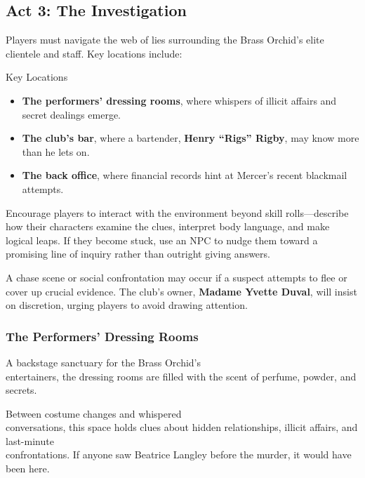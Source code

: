 \subsection{Act 3: The Investigation} 

Players must navigate the web of lies surrounding the Brass Orchid’s elite clientele and staff. Key locations include:
\begin{Example}{Key Locations}
	\begin{itemize}\raggedright
		\item \textbf{The performers’ dressing rooms}, where whispers of illicit affairs and secret dealings emerge.
		\item \textbf{The club’s bar}, where a bartender, \textbf{Henry ``Rigs'' Rigby}, may know more than he lets on.
		\item \textbf{The back office}, where financial records hint at Mercer’s recent blackmail attempts.
	\end{itemize}
\end{Example}

\begin{GmTips}
	Encourage players to interact with the environment beyond skill rolls—describe how their characters examine the clues, interpret body language, and make logical leaps. If they become stuck, use an NPC to nudge them toward a promising line of inquiry rather than outright giving answers.
\end{GmTips}

\noindent
A chase scene or social confrontation may occur if a suspect attempts to flee or cover up crucial evidence. The club’s owner, \textbf{Madame Yvette Duval}, will insist on discretion, urging players to avoid drawing attention.


\subsubsection{The Performers’ Dressing Rooms}

A backstage sanctuary for the Brass Orchid’s\\ entertainers, the dressing rooms are filled with the scent of perfume, powder, and secrets.

Between costume changes and whispered\\ conversations, this space holds clues about hidden relationships, illicit affairs, and last-minute\\ confrontations. If anyone saw Beatrice Langley before the murder, it would have been here.


